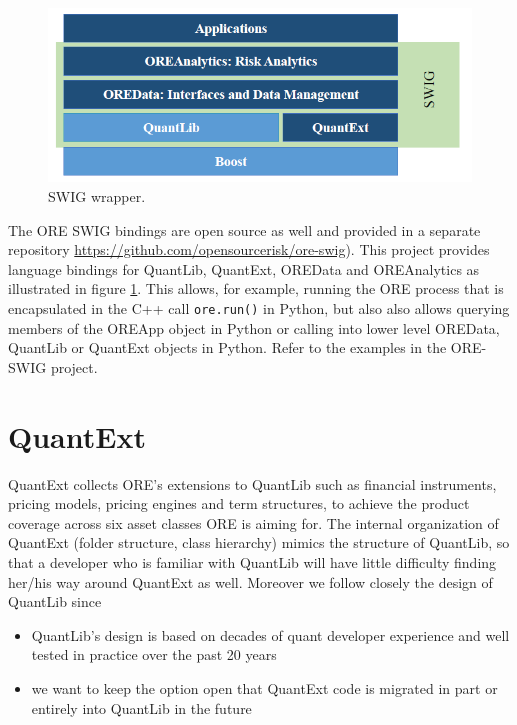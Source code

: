 \documentclass[12pt, a4paper]{article}
\begin{document}
\begin{figure}[h]
\begin{center}
\includegraphics[scale=0.6]{OverviewSWIG}
\end{center}
\caption{SWIG wrapper. }
\label{fig_SWIG}
\end{figure}

The ORE SWIG bindings are open source as well and provided in a separate repository \url{https://github.com/opensourcerisk/ore-swig}). This project provides language bindings for QuantLib, QuantExt, OREData and OREAnalytics as illustrated in figure 
\ref{fig_SWIG}. This allows, for example, running the ORE process that is encapsulated in the C++ call {\tt ore.run()} in Python, but also also allows querying members of the OREApp object in Python or calling into lower level OREData, QuantLib or
QuantExt objects in Python. Refer to the examples in the ORE-SWIG project.

\newpage
\section{QuantExt}
QuantExt collects ORE's extensions to QuantLib such as financial instruments, pricing models, pricing engines and term structures, to achieve the product coverage across six
asset classes ORE is aiming for. The internal organization of QuantExt (folder structure, class hierarchy) mimics the structure of QuantLib, so that a developer who is familiar with QuantLib will have little difficulty finding her/his way around QuantExt as well.
Moreover we follow closely the design of QuantLib since
\begin{itemize}
\item QuantLib's design is based on decades of quant developer experience and well tested in practice over the past 20 years
\item we want to keep the option open that QuantExt code is migrated in part or entirely into QuantLib in the future
\end{itemize}
\end{document}
